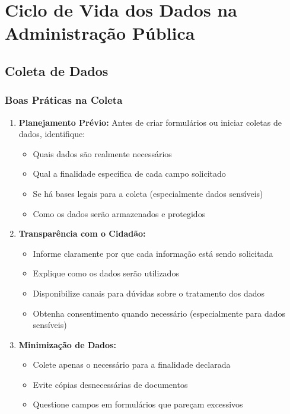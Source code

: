 \documentclass[12pt,a4paper]{article}
\begin{document}
\newpage
\section{Ciclo de Vida dos Dados na Administração Pública}

\subsection{Coleta de Dados}

\subsubsection{Boas Práticas na Coleta}
\begin{enumerate}
    \item \textbf{Planejamento Prévio:} Antes de criar formulários ou iniciar coletas de dados, identifique:
        \begin{itemize}
            \item Quais dados são realmente necessários
            \item Qual a finalidade específica de cada campo solicitado
            \item Se há bases legais para a coleta (especialmente dados sensíveis)
            \item Como os dados serão armazenados e protegidos
        \end{itemize}
    
    \item \textbf{Transparência com o Cidadão:}
        \begin{itemize}
            \item Informe claramente por que cada informação está sendo solicitada
            \item Explique como os dados serão utilizados
            \item Disponibilize canais para dúvidas sobre o tratamento dos dados
            \item Obtenha consentimento quando necessário (especialmente para dados sensíveis)
        \end{itemize}
    
    \item \textbf{Minimização de Dados:}
        \begin{itemize}
            \item Colete apenas o necessário para a finalidade declarada
            \item Evite cópias desnecessárias de documentos
            \item Questione campos em formulários que pareçam excessivos
        \end{itemize}
\end{enumerate}
\end{document}
